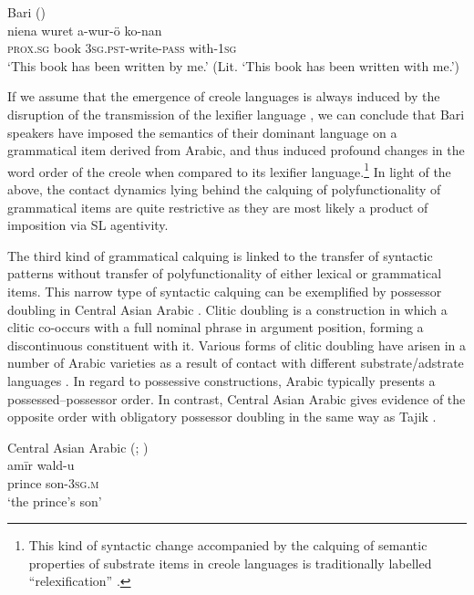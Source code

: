 \documentclass[output=paper]{langsci/langscibook}
\begin{document}
\ea
{Bari (\citealt[65]{Owen1909})}\\
\gll   niena  wuret   a-wur-ö ko-nan \\
       \textsc{prox.sg} book \textsc{3sg.pst}-write-\textsc{pass} with-\textsc{1sg}\\
\glt   `This book has been written by me.' (Lit. ‘This book has been written with me.’)
\z

If we assume that the emergence of creole languages is always induced by the disruption of the transmission of the lexifier language \citep{Comrie2011}, we can conclude that Bari speakers have imposed the semantics of their dominant language on a grammatical item derived from Arabic, and thus induced profound changes in the word order of the creole when compared to its lexifier language.\footnote{This kind of syntactic change accompanied by the calquing of semantic properties of substrate items in creole languages is traditionally labelled ``relexification'' \citep{Lefebvre1998}.}  In light of the above, the contact dynamics lying behind the calquing of polyfunctionality of grammatical items are quite restrictive as they are most likely a product of imposition via SL agentivity.  

The third kind of grammatical calquing is linked to the transfer of syntactic patterns without transfer of polyfunctionality of either lexical or grammatical items. This narrow type of syntactic calquing can be exemplified by possessor doubling in Central Asian Arabic \citep{Ratcliffe2005}. Clitic doubling is a construction in which a clitic co-occurs with a full nominal phrase in argument position, forming a discontinuous constituent with it. Various forms of clitic doubling have arisen in a number of Arabic varieties as a result of contact with different substrate/adstrate languages \citep{Souag2017clitic}. In regard to possessive constructions, Arabic typically presents a possessed–possessor order. In contrast, Central Asian Arabic  gives evidence of the opposite order with obligatory possessor doubling in the same way as Tajik . 

\ea\label{ex:key:28}
{Central Asian Arabic (\citealt{Ratcliffe2005}; \citealt[56]{Souag2017clitic})}\\
\gll   amīr wald-u\\
        prince son-\textsc{3sg.m}\\
\glt   `the prince’s son'
\z

\end{document}
